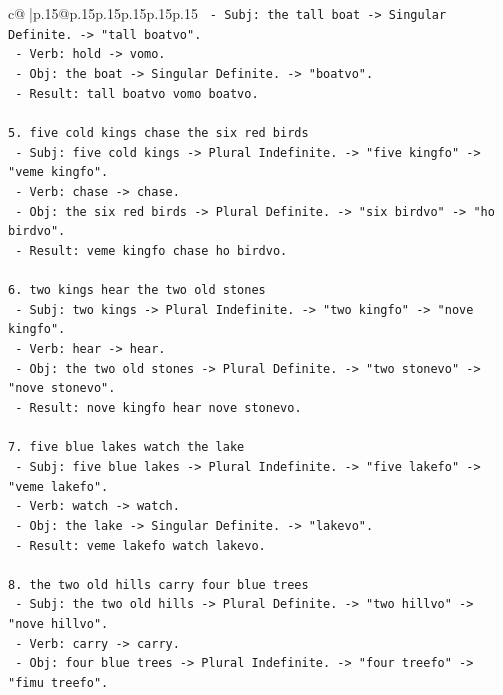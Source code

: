 \documentclass{article}
\begin{document}
{\begin{supertabular}{c@{$\;$}|p{.15\linewidth}@{}p{.15\linewidth}p{.15\linewidth}p{.15\linewidth}p{.15\linewidth}p{.15\linewidth}}
{{{\texttt{   {-} Subj: the tall boat {-}> Singular Definite. {-}> "tall boatvo".} \\
\texttt{   {-} Verb: hold {-}> vomo.} \\
\texttt{   {-} Obj: the boat {-}> Singular Definite. {-}> "boatvo".} \\
\texttt{   {-} Result: tall boatvo vomo boatvo.} \\
\\ 
\texttt{5. five cold kings chase the six red birds} \\
\texttt{   {-} Subj: five cold kings {-}> Plural Indefinite. {-}> "five kingfo" {-}> "veme kingfo".} \\
\texttt{   {-} Verb: chase {-}> chase.} \\
\texttt{   {-} Obj: the six red birds {-}> Plural Definite. {-}> "six birdvo" {-}> "ho birdvo".} \\
\texttt{   {-} Result: veme kingfo chase ho birdvo.} \\
\\ 
\texttt{6. two kings hear the two old stones} \\
\texttt{   {-} Subj: two kings {-}> Plural Indefinite. {-}> "two kingfo" {-}> "nove kingfo".} \\
\texttt{   {-} Verb: hear {-}> hear.} \\
\texttt{   {-} Obj: the two old stones {-}> Plural Definite. {-}> "two stonevo" {-}> "nove stonevo".} \\
\texttt{   {-} Result: nove kingfo hear nove stonevo.} \\
\\ 
\texttt{7. five blue lakes watch the lake} \\
\texttt{   {-} Subj: five blue lakes {-}> Plural Indefinite. {-}> "five lakefo" {-}> "veme lakefo".} \\
\texttt{   {-} Verb: watch {-}> watch.} \\
\texttt{   {-} Obj: the lake {-}> Singular Definite. {-}> "lakevo".} \\
\texttt{   {-} Result: veme lakefo watch lakevo.} \\
\\ 
\texttt{8. the two old hills carry four blue trees} \\
\texttt{   {-} Subj: the two old hills {-}> Plural Definite. {-}> "two hillvo" {-}> "nove hillvo".} \\
\texttt{   {-} Verb: carry {-}> carry.} \\
\texttt{   {-} Obj: four blue trees {-}> Plural Indefinite. {-}> "four treefo" {-}> "fimu treefo".} \\
}}}
\end{supertabular}}
\end{document}
